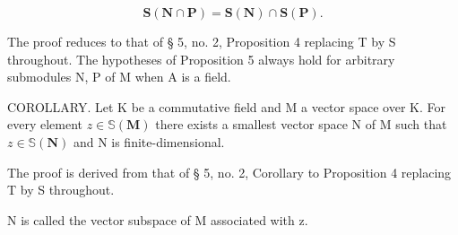 \[
\mathbf {S} (\mathbf {N} \cap \mathbf {P}) = \mathbf {S} (\mathbf {N}) \cap \mathbf {S} (\mathbf {P}).\tag{4}
\]

The proof reduces to that of § 5, no. 2, Proposition 4 replacing T by S throughout. The hypotheses of Proposition 5 always hold for arbitrary submodules N, P of M when A is a field.

COROLLARY. Let K be a commutative field and M a vector space over K. For every element \(z \in \mathbb{S}(\mathbf{M})\) there exists a smallest vector space N of M such that \(z \in \mathbb{S}(\mathbf{N})\) and N is finite-dimensional.

The proof is derived from that of § 5, no. 2, Corollary to Proposition 4 replacing T by S throughout.

N is called the vector subspace of M associated with z.

